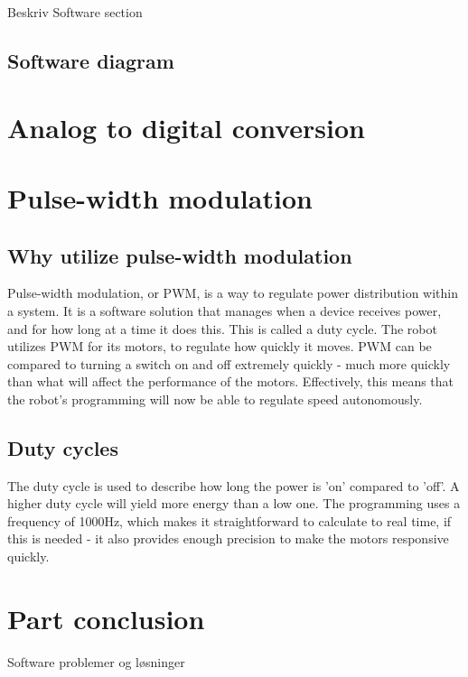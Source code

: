 
Beskriv Software section

\subsection{Software diagram}

\section{Analog to digital conversion}

\section{Pulse-width modulation}

\subsection {Why utilize pulse-width modulation}

Pulse-width modulation, or PWM, is a way to regulate power distribution within a system. It is a software solution that manages when a device receives power, and for how long at a time it does this. This is called a duty cycle. The robot utilizes PWM for its motors, to regulate how quickly it moves. PWM can be compared to turning a switch on and off extremely quickly - much more quickly than what will affect the performance of the motors. Effectively, this means that the robot's programming will now be able to regulate speed autonomously. 
 
\subsection {Duty cycles}

The duty cycle is used to describe how long the power is 'on' compared to 'off'. A higher duty cycle will yield more energy than a low one. The programming uses a frequency of 1000Hz, which makes it straightforward to calculate to real time, if this is needed - it also provides enough precision to make the motors responsive quickly.

\section{Part conclusion}
Software problemer og løsninger